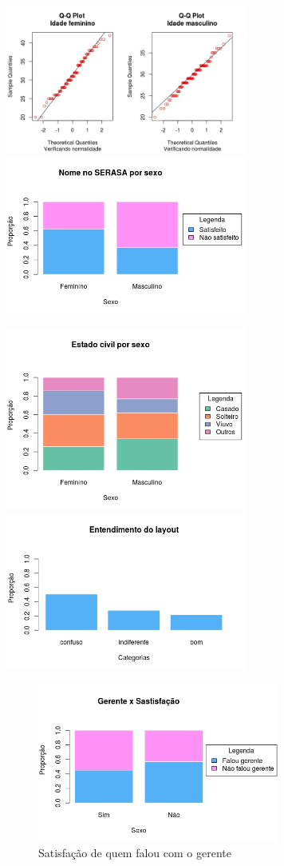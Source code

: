 \documentclass[]{article}
\begin{document}
\includegraphics[width=3.12500in]{QQ Plot idade genero.jpeg}
\includegraphics[width=3.12500in]{Nome no SERASA por sexo.jpeg}

\includegraphics[width=3.12500in]{Estado civil por Sexo.jpeg}
\includegraphics[width=3.12500in]{Entedimento do Layout.jpeg}

\begin{figure}
\centering
\includegraphics[width=3.12500in]{Gerente Satisfacao.jpeg}
\caption{Satisfação de quem falou com o gerente}
\end{figure}
\end{document}

